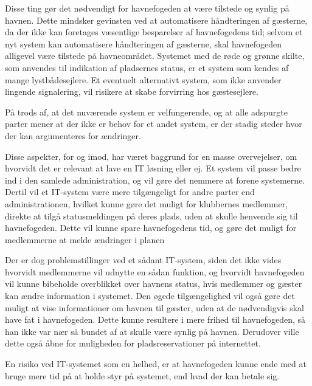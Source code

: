 Disse ting gør det nødvendigt for havnefogeden at være tilstede og synlig på havnen. Dette mindsker gevinsten ved at automatisere håndteringen af gæsterne, da der ikke kan foretages væsentlige besparelser af havnefogedens tid; selvom et nyt system kan automatisere håndteringen af gæsterne, skal havnefogeden alligevel være tilstede på havneområdet. Systemet med de røde og grønne skilte, som anvendes til indikation af pladsernes status, er et system som kendes af mange lystbådesejlere. Et eventuelt alternativt system, som ikke anvender lingende signalering, vil risikere at skabe forvirring hos gæstesejlere.


På trods af, at det nuværende system er velfungerende, og at alle adspurgte parter mener at der ikke er behov for et andet system, er der stadig steder hvor der kan argumenteres for ændringer.


Disse aspekter, for og imod, har været baggrund for en masse overvejelser, om hvorvidt det er relevant at lave en IT løsning eller ej. Et system vil passe bedre ind i den samlede administration, og vil gøre det nemmere at forene systemerne. Dertil vil et IT-system være mere tilgængeligt for andre parter end administrationen, hvilket kunne gøre det muligt for klubbernes medlemmer, direkte at tilgå statusmeldingen på deres plads, uden at skulle henvende sig til havnefogeden. Dette vil kunne spare havnefogedens tid, og gøre det muligt for medlemmerne at melde ændringer i planen 

Der er dog problemstillinger ved et sådant IT-system, siden det ikke vides hvorvidt medlemmerne vil udnytte en sådan funktion, og hvorvidt havnefogeden vil kunne bibeholde overblikket over havnens status, hvis medlemmer og gæster kan ændre information i systemet. Den øgede tilgængelighed vil også gøre det muligt at vise informationer om havnen til gæster, uden at de nødvendigvis skal have fat i havnefogeden. Dette kunne resultere i mere frihed til havnefogeden, så han ikke var nær så bundet af at skulle være synlig på havnen. Derudover ville dette også åbne for muligheden for pladsreservationer på internettet.

En risiko ved IT-systemet som en helhed, er at havnefogeden kunne ende med at bruge mere tid på at holde styr på systemet, end hvad der kan betale sig.

